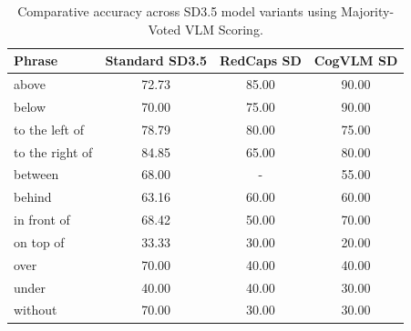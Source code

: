 
\begin{table}[ht]
\caption{Comparative accuracy across SD3.5 model variants using Majority-Voted VLM Scoring.}
\label{tab:accuracy}
\begin{center}
\begin{small}
\begin{tabular}{lccc}
\toprule
\textbf{Phrase} & \textbf{Standard SD3.5} & \textbf{RedCaps SD} & \textbf{CogVLM SD} \\
\midrule
above           & 72.73 & 85.00 & 90.00 \\
below           & 70.00 & 75.00 & 90.00 \\
to the left of  & 78.79 & 80.00 & 75.00 \\
to the right of & 84.85 & 65.00 & 80.00 \\
between         & 68.00 & -     & 55.00 \\
behind          & 63.16 & 60.00 & 60.00 \\
in front of     & 68.42 & 50.00 & 70.00 \\
on top of       & 33.33 & 30.00 & 20.00 \\
over            & 70.00 & 40.00 & 40.00 \\
under           & 40.00 & 40.00 & 30.00 \\
without         & 70.00 & 30.00 & 30.00 \\
\bottomrule
\end{tabular}
\end{small}
\end{center}
\end{table}


